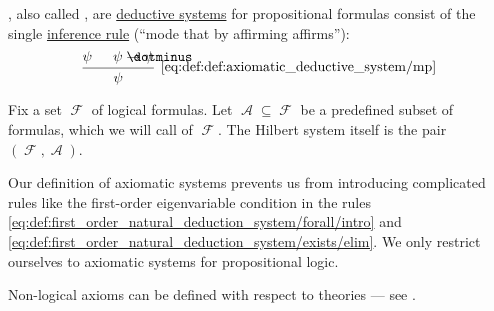 \begin{definition}\label{def:axiomatic_deductive_system}
  , also called , are \hyperref[def:deductive_system]{deductive systems} for propositional formulas consist of the single \hyperref[def:judgment/inference_rule]{inference rule}  (\enquote{mode that by affirming affirms}):
  \begin{equation*}\taglabel[\logic{MP}]{eq:def:def:axiomatic_deductive_system/mp}
    \begin{prooftree}
      \hypo{ \psi }
      \hypo{ \psi \synimplies \psi }
      \infer2[\ref{eq:def:def:axiomatic_deductive_system/mp}]{ \psi }
    \end{prooftree}
  \end{equation*}

  Fix a set \( \mscrF \) of logical formulas. Let \( \mscrA \subseteq \mscrF \) be a predefined subset of formulas, which we will call  of \( \mscrF \). The Hilbert system itself is the pair \( (\mscrF, \mscrA) \).
\end{definition}
\begin{comments}
  \item Our definition of axiomatic systems prevents us from introducing complicated rules like the first-order eigenvariable condition in the rules \eqref{eq:def:first_order_natural_deduction_system/forall/intro} and \eqref{eq:def:first_order_natural_deduction_system/exists/elim}. We only restrict ourselves to axiomatic systems for propositional logic.

  \item Non-logical axioms can be defined with respect to theories --- see .
\end{comments}

